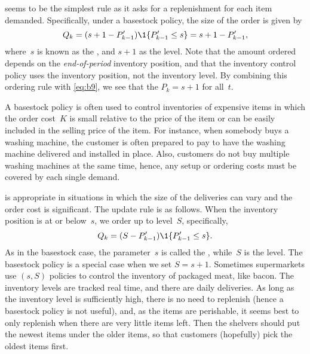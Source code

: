 \documentclass[stochastic-or.tex]{subfiles}
\begin{document}
 seems to be the simplest rule as it asks for a replenishment for each item demanded. Specifically, under a basestock policy, the  size of the order is given by
\begin{equation*}
  Q_k = (s+1-\IP_{k-1}')\1{\IP_{k-1}' \leq s} = s+1-\IP_{k-1}',
\end{equation*}
where~$s$ is known as the , and $s+1$ as the  level.
Note that the amount ordered depends on the \emph{end-of-period} inventory position, and that the inventory control policy uses the inventory position, not the inventory level. By combining this ordering rule with \cref{eq:b9}, we see that the $P_k=s+1$ for all~$t$.


A basestock policy is often used to control inventories of expensive items in which the order cost~$K$ is small relative to the price of the item or can be easily included in the selling price of the item. For instance, when somebody buys a washing machine, the customer is often prepared to pay to have the washing machine delivered and installed in place. Also, customers do not buy multiple washing machines at the same time, hence, any setup or ordering costs must be covered by  each single demand.



 is appropriate in situations in which the size of the deliveries can vary and the order cost is significant. The update rule is as follows.
When the inventory position is at or below~$s$, we order up to level~$S$, specifically,
\begin{equation*}
  Q_k = (S-\IP_{k-1}')\1{\IP_{k-1}' \leq s}.
\end{equation*}
As in the basestock case, the parameter~$s$ is called the , while~$S$ is the  level.
The basestock policy is a special case when we set $S=s+1$.
Sometimes supermarkets use $(s,S)$ policies to control the inventory of packaged meat, like bacon.
The inventory levels are tracked real time, and there are daily deliveries.
As long as the inventory level is sufficiently high, there is no need to replenish (hence a basestock policy is not useful), and, as the items are perishable, it seems best to only replenish when there are very little items left.
Then the shelvers should put the newest items under the older items, so that customers (hopefully) pick the oldest items first.
\end{document}
